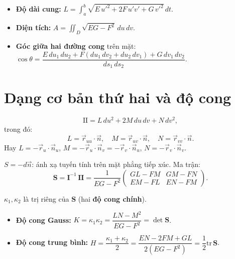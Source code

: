 \documentclass[12pt,a4paper]{article}
\begin{document}
\begin{congthuc}[title={Ứng dụng dạng I}]
  \begin{itemize}
    \item \textbf{Độ dài cung:} $L = \displaystyle\int_a^b \sqrt{E\,u'^2 + 2F\,u'v' + G\,v'^2}\,dt$.
    \item \textbf{Diện tích:} $A = \displaystyle\iint_D \sqrt{EG - F^2}\,du\,dv$.
    \item \textbf{Góc giữa hai đường cong} trên mặt: $\cos\theta = \dfrac{E\,du_1\,du_2 + F(du_1\,dv_2 + du_2\,dv_1) + G\,dv_1\,dv_2}{ds_1\,ds_2}$.
  \end{itemize}
\end{congthuc}

\section{Dạng cơ bản thứ hai và độ cong}

\begin{dinhnghia}[title={Dạng cơ bản thứ hai (Second Fundamental Form)}]
  \[
    \mathrm{II} = L\,du^2 + 2M\,du\,dv + N\,dv^2,
  \]
  trong đó:
  \[
    L = \vec{r}_{uu} \cdot \vec{n}, \quad M = \vec{r}_{uv} \cdot \vec{n}, \quad N = \vec{r}_{vv} \cdot \vec{n}.
  \]
  Hay $L = -\vec{r}_u \cdot \vec{n}_u$, $M = -\vec{r}_u \cdot \vec{n}_v = -\vec{r}_v \cdot \vec{n}_u$, $N = -\vec{r}_v \cdot \vec{n}_v$.
\end{dinhnghia}

\begin{dinhnghia}[title={Toán tử Weingarten (shape operator)}]
  $S = -d\vec{n}$: ánh xạ tuyến tính trên mặt phẳng tiếp xúc. Ma trận:
  \[
    \mathbf{S} = \mathbf{I}^{-1}\,\mathbf{II} = \frac{1}{EG - F^2}\begin{pmatrix} GL - FM & GM - FN \\ EM - FL & EN - FM \end{pmatrix}.
  \]
\end{dinhnghia}

\begin{dinhnghia}[title={Độ cong chính, Gauss, trung bình}]
  $\kappa_1, \kappa_2$ là trị riêng của $\mathbf{S}$ (hai \textbf{độ cong chính}).
  \begin{itemize}
    \item \textbf{Độ cong Gauss:} $K = \kappa_1 \kappa_2 = \dfrac{LN - M^2}{EG - F^2} = \det \mathbf{S}$.
    \item \textbf{Độ cong trung bình:} $H = \dfrac{\kappa_1 + \kappa_2}{2} = \dfrac{EN - 2FM + GL}{2(EG - F^2)} = \dfrac{1}{2}\text{tr}\,\mathbf{S}$.
  \end{itemize}
\end{dinhnghia}
\end{document}

